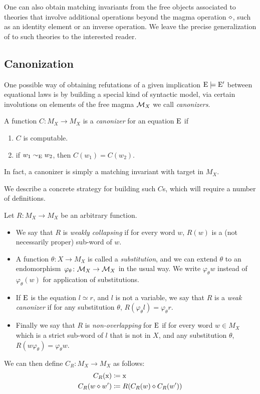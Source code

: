 \begin{remark}  One can also obtain matching invariants from the free objects associated to theories that involve additional operations beyond the magma operation $\diamond$, such as an identity element or an inverse operation.  We leave the precise generalization of  to such theories to the interested reader.
\end{remark}

\subsection{Canonization}\label{canon-sec}

One possible way of obtaining refutations of a given implication $\mathrm{E} \models \mathrm{E}'$ between equational laws is by building a special kind of syntactic model, via certain involutions on elements of the free magma ${\mathcal{M}}_X$ we call \emph{canonizers}.

\begin{definition}
  A function $C\colon M_X\rightarrow M_X$ is a \emph{canonizer} for an equation $\mathrm{E}$ if
  \begin{enumerate}
    \item $C$ is computable.
    \item if $w_1\sim_{\mathrm{E}} w_2$, then $C(w_1) = C(w_2)$.
  \end{enumerate}
\end{definition}

In fact, a canonizer is simply a matching invariant with target in $M_X$.

We describe a concrete strategy for building such $C$s, which will require a number of definitions.


\begin{definition}\label{def:canon}
Let $R \colon M_X \to M_X$ be an arbitrary function.
\begin{itemize}
\item  We say that $R$ is \emph{weakly collapsing} if for every word $w$, $R(w)$ is a (not necessarily proper) sub-word of $w$.
\item  A function $\theta\colon X\rightarrow M_X$ is called a \emph{substitution}, and we can extend $\theta$ to an endomorphism~$\varphi_\theta \colon {\mathcal{M}}_X\rightarrow{\mathcal{M}}_X$ in the usual way. We write $\varphi_\theta w$ instead of $\varphi_\theta(w)$ for application of substitutions.
\item  If $\mathrm{E}$ is the equation $l\simeq r$, and $l$ is not a variable, we say that $R$ is a \emph{weak canonizer} if for any substitution $\theta$, $R(\varphi_\theta l)=\varphi_\theta r$.
\item  Finally we say that $R$ is \emph{non-overlapping} for $\mathrm{E}$ if for every word $w\in M_X$ which is a strict sub-word of $l$ that is not in $X$, and any substitution $\theta$, $R(w\varphi_\theta) = \varphi_\theta w$.
\end{itemize}
  We can then define $C_R\colon M_X\rightarrow M_X$ as follows:
\begin{align}
  C_R(\mathrm{x}) &\coloneqq \mathrm{x}\\
  C_R(w\diamond w') &\coloneqq R(C_R(w)\diamond C_R(w'))
\end{align}
\end{definition}

